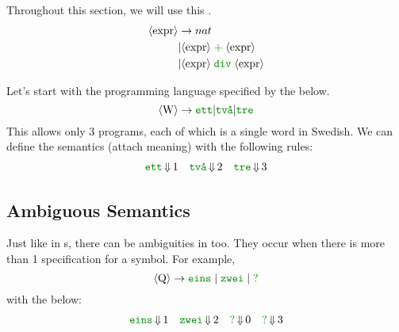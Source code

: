 \begin{blackbox}
  Throughout this section, we will use this  .
  \begin{equation}\label{eq:DivAdd_Grammar}
    \begin{aligned}
      \Nonterminal{expr} &\rightarrow nat \\
      &\vert \Nonterminal{expr} \; \SemanticInput{\mathtt{+}} \; \Nonterminal{expr} \\
      &\vert \Nonterminal{expr} \; \SemanticInput{\mathtt{div}} \; \Nonterminal{expr} \\
    \end{aligned}
  \end{equation}
\end{blackbox}

Let's start with the programming language specified by the  below.
\begin{equation*}
  \Nonterminal{W} \rightarrow \SemanticInput{\mathtt{ett}} \vert \SemanticInput{\text{\texttt{tv\r{a}}}} \vert \SemanticInput{\mathtt{tre}}
\end{equation*}
This allows only 3 programs, each of which is a single word in Swedish.
We can define the semantics (attach meaning) with the following rules:
\begin{align*}
  \SemanticInput{\mathtt{ett}} &\EvaluatesTo 1 & \SemanticInput{\text{\texttt{tv\r{a}}}} &\EvaluatesTo 2 & \SemanticInput{\mathtt{tre}} &\EvaluatesTo 3 \\
\end{align*}

\subsection{Ambiguous Semantics}\label{subsec:Ambiguous_Semantics}
Just like in s, there can be ambiguities in  too.
They occur when there is more than 1 specification for a symbol.
For example,
\begin{equation*}
  \Nonterminal{Q} \rightarrow \SemanticInput{\mathtt{eins}} \; \vert \; \SemanticInput{\mathtt{zwei}} \; \vert \; \SemanticInput{\mathtt{?}}
\end{equation*}
with the  below:
\begin{align*}
  \SemanticInput{\mathtt{eins}} &\EvaluatesTo 1 & \SemanticInput{\mathtt{zwei}} &\EvaluatesTo 2 & \SemanticInput{\mathtt{?}} &\EvaluatesTo 0 & \SemanticInput{\mathtt{?}} &\EvaluatesTo 3 \\
\end{align*}

